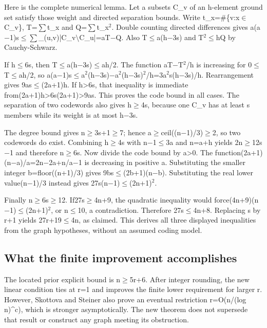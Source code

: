 \documentclass[11pt,a4paper]{article}
\begin{document}
Here is the complete numerical lemma. Let a subsets C\_v of an h-element ground set satisfy those weight and directed separation bounds. Write t\_x=\#\{v:x\ensuremath{\in}C\_v\}, T=\ensuremath{\sum}t\_x and Q=\ensuremath{\sum}t\_x\ensuremath{^2}. Double counting directed differences gives a(a\ensuremath{-}1)s\ensuremath{\leq}\ensuremath{\sum}\_(u,v)|C\_v\ensuremath{\setminus}C\_u|=aT\ensuremath{-}Q. Also T\ensuremath{\leq}a(h\ensuremath{-}3s) and T\ensuremath{^2}\ensuremath{\leq}hQ by Cauchy-Schwarz.

If h\ensuremath{\leq}6s, then T\ensuremath{\leq}a(h\ensuremath{-}3s)\ensuremath{\leq}ah/2. The function aT\ensuremath{-}T\ensuremath{^2}/h is increasing for 0\ensuremath{\leq}T\ensuremath{\leq}ah/2, so a(a\ensuremath{-}1)s\ensuremath{\leq}a\ensuremath{^2}(h\ensuremath{-}3s)\ensuremath{-}a\ensuremath{^2}(h\ensuremath{-}3s)\ensuremath{^2}/h=3a\ensuremath{^2}s(h\ensuremath{-}3s)/h. Rearrangement gives 9as\ensuremath{\leq}(2a+1)h. If h>6s, that inequality is immediate from(2a+1)h>6s(2a+1)>9as. This proves the code bound in all cases. The separation of two codewords also gives h\ensuremath{\geq}4s, because one C\_v has at least s members while its weight is at most h\ensuremath{-}3s.

The degree bound gives n\ensuremath{\geq}3s+1\ensuremath{\geq}7; hence a\ensuremath{\geq}ceil((n\ensuremath{-}1)/3)\ensuremath{\geq}2, so two codewords do exist. Combining h\ensuremath{\geq}4s with n\ensuremath{-}1\ensuremath{\leq}3a and n=a+h yields 2n\ensuremath{\geq}12s\ensuremath{-}1 and therefore n\ensuremath{\geq}6s. Now divide the code bound by a>0. The function(2a+1)(n\ensuremath{-}a)/a=2n\ensuremath{-}2a+n/a\ensuremath{-}1 is decreasing in positive a. Substituting the smaller integer b=floor((n+1)/3) gives 9bs\ensuremath{\leq}(2b+1)(n\ensuremath{-}b). Substituting the real lower value(n\ensuremath{-}1)/3 instead gives 27s(n\ensuremath{-}1)\ensuremath{\leq}(2n+1)\ensuremath{^2}.

Finally n\ensuremath{\geq}6s\ensuremath{\geq}12. If27s\ensuremath{\geq}4n+9, the quadratic inequality would force(4n+9)(n\ensuremath{-}1)\ensuremath{\leq}(2n+1)\ensuremath{^2}, or n\ensuremath{\leq}10, a contradiction. Therefore 27s\ensuremath{\leq}4n+8. Replacing s by r+1 yields 27r+19\ensuremath{\leq}4n, as claimed. This derives all three displayed inequalities from the graph hypotheses, without an assumed coding model.

\subsection{What the finite improvement accomplishes}
The located prior explicit bound is n\ensuremath{\geq}5r+6. After integer rounding, the new linear condition ties at r=1 and improves the finite lower requirement for larger r. However, Skottova and Steiner also prove an eventual restriction r=O(n/(log n)\textasciicircum{}c), which is stronger asymptotically. The new theorem does not supersede that result or construct any graph meeting its obstruction.
\end{document}
